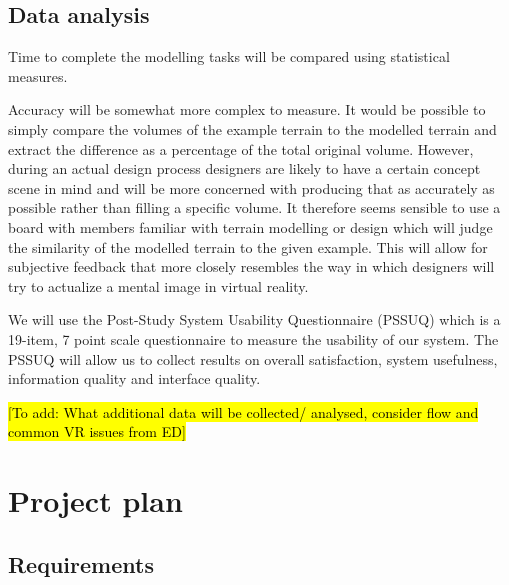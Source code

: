 \documentclass{sig-alternate-05-2015}
\begin{document}
\subsection{Data analysis}
Time to complete the modelling tasks will be compared using statistical measures.

Accuracy will be somewhat more complex to measure. It would be possible to simply compare the volumes of the example terrain to the modelled terrain and extract the difference as a percentage of the total original volume. However, during an actual design process designers are likely to have a certain concept scene in mind and will be more concerned with producing that as accurately as possible rather than filling a specific volume. It therefore seems sensible to use a board with members familiar with terrain modelling or design which will judge the similarity of the modelled terrain to the given example. This will allow for subjective feedback that more closely resembles the way in which designers will try to actualize a mental image in virtual reality.

We will use the Post-Study System Usability Questionnaire (PSSUQ) which is a 19-item, 7 point scale questionnaire\cite{Lewis1995} to measure the usability of our system. The PSSUQ will allow us to collect results on overall satisfaction, system usefulness, information quality and interface quality.

\hl{[To add: What additional data will be collected/ analysed, consider flow and common VR issues from ED]}

\section{Project plan}
\subsection{Requirements}
\end{document}
